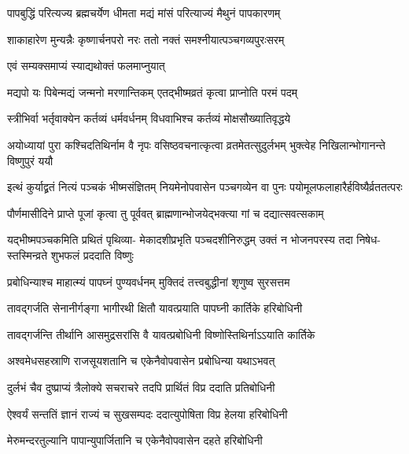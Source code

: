 \twolineshloka
{पापबुद्धिं परित्यज्य ब्रह्मचर्येण धीमता}
{मद्यं मांसं परित्याज्यं मैथुनं पापकारणम्} %

\twolineshloka
{शाकाहारेण मुन्यन्नैः कृष्णार्चनपरो नरः}
{ततो नक्तं समश्नीयात्पञ्चगव्यपुरःसरम्} %


\onelineshloka
{एवं सम्यक्समाप्यं स्याद्यथोक्तं फलमाप्नुयात्} %

\twolineshloka
{मद्यपो यः पिबेन्मद्यं जन्मनो मरणान्तिकम्}
{एतद्भीष्मव्रतं कृत्वा प्राप्नोति परमं पदम्} %

\twolineshloka
{स्त्रीभिर्वा भर्तृवाक्येन कर्तव्यं धर्मवर्धनम्}
{विधवाभिश्च कर्तव्यं मोक्षसौख्यातिवृद्धये} %

\threelineshloka
{अयोध्यायां पुरा कश्चिदतिथिर्नाम वै नृपः}
{वसिष्ठवचनात्कृत्वा व्रतमेतत्सुदुर्लभम्}
{भुक्त्वेह निखिलान्भोगानन्ते विष्णुपुरं ययौ} %

\threelineshloka
{इत्थं कुर्याद्व्रतं नित्यं पञ्चकं भीष्मसंज्ञितम्}
{नियमेनोपवासेन पञ्चगव्येन वा पुनः}
{पयोमूलफलाहारैर्हविष्यैर्व्रततत्परः} %

\twolineshloka
{पौर्णमासीदिने प्राप्ते पूजां कृत्वा तु पूर्ववत्}
{ब्राह्मणान्भोजयेद्भक्त्या गां च दद्यात्सवत्सकाम्} %

\fourlineindentedshloka
{यद्भीष्मपञ्चकमिति प्रथितं पृथिव्या-}
{मेकादशीप्रभृति पञ्चदशीनिरुद्धम्}
{उक्तं न भोजनपरस्य तदा निषेध-}
{स्तस्मिन्व्रते शुभफलं प्रददाति विष्णुः} %





\twolineshloka
{प्रबोधिन्याश्च माहात्म्यं पापघ्नं पुण्यवर्धनम्}
{मुक्तिदं तत्त्वबुद्धीनां शृणुष्व सुरसत्तम} %

\twolineshloka
{तावद्गर्जति सेनानीर्गङ्गा भागीरथी क्षितौ}
{यावत्प्रयाति पापघ्नी कार्तिके हरिबोधिनी} %

\twolineshloka
{तावद्गर्जन्ति तीर्थानि आसमुद्रसरांसि वै}
{यावत्प्रबोधिनी विष्णोस्तिथिर्नाऽऽयाति कार्तिके} %

\twolineshloka
{अश्वमेधसहस्राणि राजसूयशतानि च}
{एकेनैवोपवासेन प्रबोधिन्या यथाऽभवत्} %

\twolineshloka
{दुर्लभं चैव दुष्प्राप्यं त्रैलोक्ये सचराचरे}
{तदपि प्रार्थितं विप्र ददाति प्रतिबोधिनी} %

\twolineshloka
{ऐश्वर्यं सन्ततिं ज्ञानं राज्यं च सुखसम्पदः}
{ददात्युपोषिता विप्र हेलया हरिबोधिनी} %

\twolineshloka
{मेरुमन्दरतुल्यानि पापान्युपार्जितानि च}
{एकेनैवोपवासेन दहते हरिबोधिनी} %

